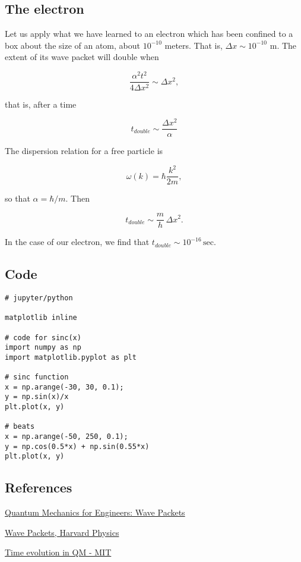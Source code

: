 \subsection{The electron}

Let us apply what we have learned to an electron which has been confined to a box about the size of an atom, about $10^{-10}$ meters. That is, $\Delta x \sim 10^{-10}\text{ m}$.  The extent of its wave packet will double when 

\begin{equation}
\frac{\alpha^2 t^2}{4 \Delta x^2} \sim \Delta x^2,
\end{equation}

that is, after a time

\begin{equation}
t_{double} \sim \frac{\Delta x^2}{\alpha}
\end{equation}

The dispersion relation for a free particle is

\begin{equation}
  \omega(k) = \hbar \frac{k^2}{2m},
\end{equation}

so that $\alpha = \hbar/m$.  Then

\begin{equation}
t_{double} \sim \frac{m}{h}\, \Delta x^2 .
\end{equation}

In the case of our electron, we find that $t_{double} \sim 10^{-16}\,\text{sec}$.

\subsection{ Code}



\begin{verbatim}
# jupyter/python

matplotlib inline

# code for sinc(x)
import numpy as np
import matplotlib.pyplot as plt

# sinc function
x = np.arange(-30, 30, 0.1);
y = np.sin(x)/x
plt.plot(x, y)

# beats
x = np.arange(-50, 250, 0.1);
y = np.cos(0.5*x) + np.sin(0.55*x)
plt.plot(x, y)
\end{verbatim}



\subsection{References}

\href{https://www.eng.fsu.edu/~dommelen/quantum/style_a/packets.html}{Quantum Mechanics for Engineers: Wave Packets}

\href{https://users.physics.harvard.edu/~schwartz/15cFiles/Lecture11-WavePackets.pdf}{Wave Packets, Harvard Physics}

\href{https//ocw.mit.edu/courses/nuclear-engineering/22-02-introduction-to-applied-nuclear-physics-spring-2012/lecture-notes/MIT22_02S12_lec_ch6.pdf}{Time evolution in QM - MIT}



